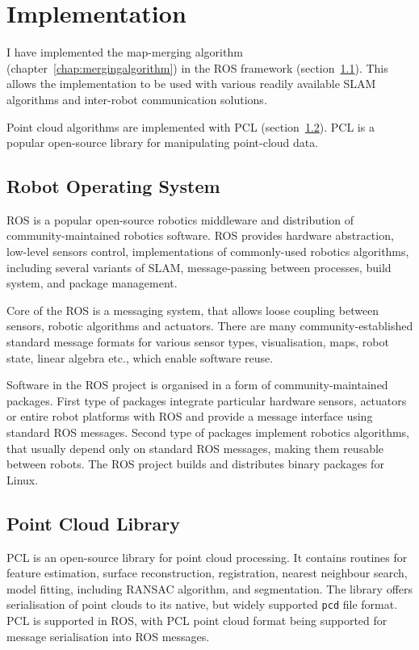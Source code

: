 \chapter{Implementation}
\label{chap:implementation}

I have implemented the map-merging algorithm (chapter~\ref{chap:mergingalgorithm}) in the \gls{ROS} framework (section~\ref{sec:ros}). This allows the implementation to be used with various readily available \gls{SLAM} algorithms and inter-robot communication solutions.

Point cloud algorithms are implemented with \gls{PCL} (section~\ref{sec:pcl}). \gls{PCL} is a popular open-source library for manipulating point-cloud data.

\section{Robot Operating System}
\label{sec:ros}

\gls{ROS} is a popular open-source robotics middleware and distribution of community-maintained robotics software. \gls{ROS} provides hardware abstraction, low-level sensors control, implementations of commonly-used robotics algorithms, including several variants of \gls{SLAM}, message-passing between processes, build system, and package management.

Core of the \gls{ROS} is a messaging system, that allows loose coupling between sensors, robotic algorithms and actuators. There are many community-established standard message formats for various sensor types, visualisation, maps, robot state, linear algebra etc., which enable software reuse.

Software in the \gls{ROS} project is organised in a form of community-maintained packages. First type of packages integrate particular hardware sensors, actuators or entire robot platforms with \gls{ROS} and provide a message interface using standard \gls{ROS} messages. Second type of packages implement robotics algorithms, that usually depend only on standard \gls{ROS} messages, making them reusable between robots. The \gls{ROS} project builds and distributes binary packages for Linux.

\section{Point Cloud Library}
\label{sec:pcl}

\gls{PCL} is an open-source library for point cloud processing. It contains routines for feature estimation, surface reconstruction, registration, nearest neighbour search, model fitting, including \gls{RANSAC} algorithm, and segmentation. The library offers serialisation of point clouds to its native, but widely supported \texttt{pcd} file format. \Gls{PCL} is supported in \gls{ROS}, with \gls{PCL} point cloud format being supported for message serialisation into \gls{ROS} messages.

